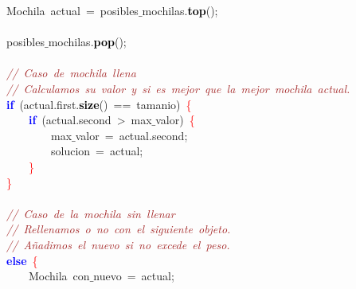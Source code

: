 \mbox{}\ \ \ \ \ \ \ \ \textcolor{TealBlue}{Mochila}\ actual\ \textcolor{BrickRed}{=}\ posibles$\_$mochilas\textcolor{BrickRed}{.}\textbf{\textcolor{Black}{top}}\textcolor{BrickRed}{();} \\
\mbox{}\ \ \ \ \ \ \ \  \\
\mbox{}\ \ \ \ \ \ \ \ posibles$\_$mochilas\textcolor{BrickRed}{.}\textbf{\textcolor{Black}{pop}}\textcolor{BrickRed}{();} \\
\mbox{}\ \ \ \ \ \ \ \  \\
\mbox{}\ \ \ \ \ \ \ \ \textit{\textcolor{Brown}{//\ Caso\ de\ mochila\ llena}} \\
\mbox{}\ \ \ \ \ \ \ \ \textit{\textcolor{Brown}{//\ Calculamos\ su\ valor\ y\ si\ es\ mejor\ que\ la\ mejor\ mochila\ actual.}} \\
\mbox{}\ \ \ \ \ \ \ \ \textbf{\textcolor{Blue}{if}}\ \textcolor{BrickRed}{(}actual\textcolor{BrickRed}{.}first\textcolor{BrickRed}{.}\textbf{\textcolor{Black}{size}}\textcolor{BrickRed}{()}\ \textcolor{BrickRed}{==}\ tamanio\textcolor{BrickRed}{)}\ \textcolor{Red}{\{} \\
\mbox{}\ \ \ \ \ \ \ \ \ \ \ \ \textbf{\textcolor{Blue}{if}}\ \textcolor{BrickRed}{(}actual\textcolor{BrickRed}{.}second\ \textcolor{BrickRed}{\textgreater{}}\ max$\_$valor\textcolor{BrickRed}{)}\ \textcolor{Red}{\{} \\
\mbox{}\ \ \ \ \ \ \ \ \ \ \ \ \ \ \ \ max$\_$valor\ \textcolor{BrickRed}{=}\ actual\textcolor{BrickRed}{.}second\textcolor{BrickRed}{;} \\
\mbox{}\ \ \ \ \ \ \ \ \ \ \ \ \ \ \ \ solucion\ \textcolor{BrickRed}{=}\ actual\textcolor{BrickRed}{;} \\
\mbox{}\ \ \ \ \ \ \ \ \ \ \ \ \textcolor{Red}{\}} \\
\mbox{}\ \ \ \ \ \ \ \ \textcolor{Red}{\}} \\
\mbox{}\ \ \ \ \ \ \ \  \\
\mbox{}\ \ \ \ \ \ \ \ \textit{\textcolor{Brown}{//\ Caso\ de\ la\ mochila\ sin\ llenar}} \\
\mbox{}\ \ \ \ \ \ \ \ \textit{\textcolor{Brown}{//\ Rellenamos\ o\ no\ con\ el\ siguiente\ objeto.}} \\
\mbox{}\ \ \ \ \ \ \ \ \textit{\textcolor{Brown}{//\ Añadimos\ el\ nuevo\ si\ no\ excede\ el\ peso.}} \\
\mbox{}\ \ \ \ \ \ \ \ \textbf{\textcolor{Blue}{else}}\ \textcolor{Red}{\{} \\
\mbox{}\ \ \ \ \ \ \ \ \ \ \ \ \textcolor{TealBlue}{Mochila}\ con$\_$nuevo\ \textcolor{BrickRed}{=}\ actual\textcolor{BrickRed}{;} \\
